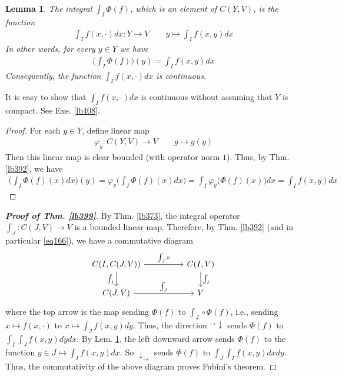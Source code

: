 \documentclass[12pt,b5paper,notitlepage]{article}
\theoremstyle{definition}
\theoremstyle{plain}
\newtheorem{lm}[df]{Lemma}
\numberwithin{equation}{section}
\begin{document}
\begin{lm}\label{lb400}
The integral  $\int_I\Phi(f)$, which is an element of $C(Y,V)$, is the function
\begin{align}
\int_If(x,\cdot)dx:Y\rightarrow V\qquad y\mapsto \int_I f(x,y)dx
\end{align}
In other words, for every $y\in Y$ we have
\begin{align}
\Big(\int_I\Phi(f)\Big)(y)=\int_I f(x,y)dx
\end{align}
Consequently, the function $\int_If(x,\cdot)dx$ is continuous.
\end{lm}


It is easy to show that $\int_If(x,\cdot)dx$ is continuous without assuming that $Y$ is compact. See Exe. \ref{lb408}.


\begin{proof}
For each $y\in Y$, define linear map
\begin{align*}
\varphi_y:C(Y,V)\rightarrow V\qquad g\mapsto g(y)
\end{align*}
Then this linear map is clear bounded (with operator norm $1$). Thus, by Thm. \ref{lb392}, we have
\begin{align*}
\Big(\int_I\Phi(f)(x)dx\Big)(y)=\varphi_y\Big(\int_I\Phi(f)(x)dx\Big)=\int_I\varphi_y\big(\Phi(f)(x)\big)dx=\int_I f(x,y)dx
\end{align*}
\end{proof}



\begin{proof}[\textbf{Proof of Thm. \ref{lb399}}]
By Thm. \ref{lb373}, the integral operator $\int_J:C(J,V)\rightarrow V$ is a bounded linear map. Therefore, by Thm. \ref{lb392} (and in particular \eqref{eq166}), we have a commutative diagram
\begin{equation*}
\begin{tikzcd}[column sep=huge]
C(I,C(J,V)) \arrow[r,"\int_J\circ"] \arrow[d,"\int_I"'] & C(I,V) \arrow[d,"\int_I"] \\
C(J,V) \arrow[r,"\int_J"]           & V          
\end{tikzcd} 
\end{equation*}
where the top arrow is the map sending $\Phi(f)$ to $\int_J\circ\Phi(f)$, i.e., sending $x\mapsto f(x,\cdot)$ to $x\mapsto \int_J f(x,y)dy$. Thus, the direction ${}^\rightarrow\!\downarrow$ sends $\Phi(f)$ to $\int_I\int_Jf(x,y)dydx$. By Lem. \ref{lb400}, the left downward arrow sends $\Phi(f)$ to the function $y\in J\mapsto \int_I f(x,y)dx$. So $\downarrow_\rightarrow$ sends $\Phi(f)$ to $\int_J\int_I f(x,y)dxdy$. Thus, the commutativity of the above diagram proves Fubini's theorem.
\end{proof}
\end{document}
